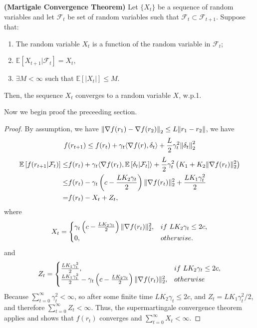 \begin{theorem}
    \textbf{(Martigale Convergence Theorem)}
    Let $ \{ X_t \} $ be a sequence of random variables and let $ \mathcal{F}_t $ be set of random variables such that $ \mathcal{F}_t \subset \mathcal{F}_{t+1} $.
    Suppose that:
    \begin{enumerate}
        \item The random variable $ X_t $ is a function of the random variable in $ \mathcal{F}_t $;
        \item $ \mathbb{E}\left[ X_{t+1} | \mathcal{F}_t \right] = X_t $,
        \item $ \exists M < \infty $ such that $ \mathbb{E}\left[ \left| X_t \right| \right] \le M $.
    \end{enumerate}
    Then, the sequence $ X_t $ converges to a random variable $ X $, w.p.1.

    Now we begin proof the preceeding section.
    \begin{proof}
        By assumption, we have $ {\Arrowvert \nabla f(r_1) - \nabla f(r_2) \Arrowvert}_2 \le L \Arrowvert r_1 - r_2 \Arrowvert $, we have
        \[
            f(r_{t+1}) \le f(r_t) + \gamma_t \langle \nabla f(r), \delta_t \rangle + \frac{L}{2} \gamma^2_t {\Arrowvert \delta_t \Arrowvert}_2^2
        \]
        \begin{align*}
            \mathbb{E} \left[ f(r_{t+1} | \mathcal{F}_t) \right]
            \le& f(r_t) + \gamma_t \langle \nabla f(r_t), \mathbb{E} \left[ \delta_t | \mathcal{F}_t \right] \rangle + \frac{L}{2} \gamma^2_t \left( K_1 + K_2 \Arrowvert \nabla f(r_t) \Arrowvert^2_2 \right)\\
            \le& f(r_t) - \gamma_t \left( c - \frac{L K_2 \gamma_t}{2}  \right) \Arrowvert \nabla f(r_t) \Arrowvert^2_2 + \frac{L K_1 \gamma^2_t}{2} \\
            =& f(r_t) - X_t + Z_t,
        \end{align*}
        where
        \[
            X_t =
            \begin{cases}
                \gamma_t \left( c - \frac{L K_2 \gamma_t}{2}  \right) \Arrowvert \nabla f(r_t) \Arrowvert^2_2, & if\ LK_2\gamma_t \le 2c, \\
                0, & otherwise.
            \end{cases}
        \]
        and
        \[
            Z_t = 
            \begin{cases}
                \frac{L K_1 \gamma^2_t}{2}, & if\ LK_2 \gamma_t \le 2c,\\
                \frac{L K_1 \gamma^2_t}{2} - \gamma_t \left( c - \frac{L K_2 \gamma_t}{2}  \right) \Arrowvert \nabla f(r_t) \Arrowvert^2_2, & otherwise
            \end{cases}
        \]
        Because $ \sum^{\infty}_{t=0} \gamma^2_t < \infty $, so after some finite time $ LK_2 \gamma_t \le 2c $, and $ Z_t = LK_1 \gamma^2_t / 2 $, and therefore $ \sum^{\infty}_{t=0} Z_t < \infty $.
        Thus, the supermartingale convergence theorem applies and shows that $ f(r_t) $ converges and $ \sum^{\infty}_{t=0} X_t < \infty $.


\end{proof}
\end{theorem}
